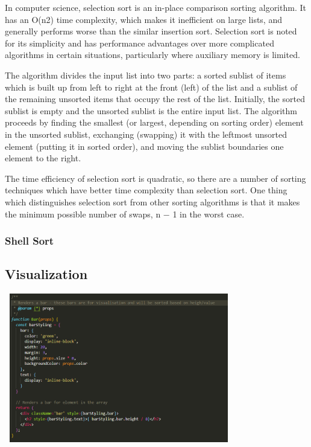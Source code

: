 In computer science, selection sort is an in-place comparison sorting algorithm. It has an O(n2) time complexity, which makes it inefficient on large lists, and generally performs worse than the similar insertion sort. Selection sort is noted for its simplicity and has performance advantages over more complicated algorithms in certain situations, particularly where auxiliary memory is limited.
\par
\bigskip
The algorithm divides the input list into two parts: a sorted sublist of items which is built up from left to right at the front (left) of the list and a sublist of the remaining unsorted items that occupy the rest of the list. Initially, the sorted sublist is empty and the unsorted sublist is the entire input list. The algorithm proceeds by finding the smallest (or largest, depending on sorting order) element in the unsorted sublist, exchanging (swapping) it with the leftmost unsorted element (putting it in sorted order), and moving the sublist boundaries one element to the right.
\par
\bigskip
The time efficiency of selection sort is quadratic, so there are a number of sorting techniques which have better time complexity than selection sort. One thing which distinguishes selection sort from other sorting algorithms is that it makes the minimum possible number of swaps, n − 1 in the worst case.

\subsubsection{Shell Sort}

\subsection{Visualization}
\begin{center}
    \includegraphics[height=6.5cm,width=10cm]{images/bar}
    \label{fig:main_page}
\end{center}

